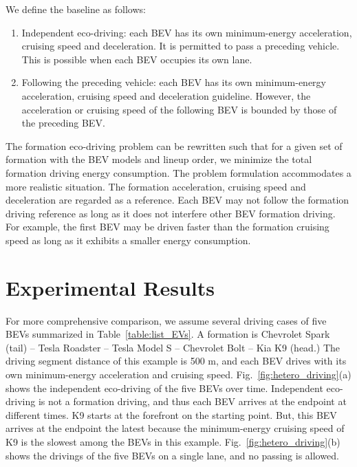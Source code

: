 \documentclass{IEEEtran}
\begin{document}
We define the baseline as follows:
\begin{enumerate}
\item Independent eco-driving: each BEV has its own minimum-energy acceleration, cruising speed and deceleration. 
It is permitted to pass a preceding vehicle. This is possible when each BEV occupies its own lane.
\item Following the preceding vehicle: each BEV has its own minimum-energy acceleration, cruising speed and deceleration guideline. However, the acceleration or cruising speed of the following BEV is bounded by those of the preceding BEV.
\end{enumerate}

The formation eco-driving problem can be rewritten such that for a given set of formation with the BEV models and lineup order, we minimize the total formation driving energy consumption.
The problem formulation accommodates a more realistic situation. The formation acceleration, cruising speed and deceleration are regarded as a reference. Each BEV may not follow the formation driving reference as long as it does not interfere other BEV formation driving. For example, the first BEV may be driven faster than the formation cruising speed as long as it exhibits a smaller energy consumption.

\section{Experimental Results}\label{sec:exp}



For more comprehensive comparison, we assume several driving cases of five BEVs summarized in Table~\ref{table:list_EVs}. A formation is Chevrolet Spark (tail) -- Tesla Roadster -- Tesla Model S -- Chevrolet Bolt -- Kia K9 (head.)
The driving segment distance of this example is 500 m, and each BEV drives with its own minimum-energy acceleration and cruising speed. 
Fig.~\ref{fig:hetero_driving}(a) shows the independent eco-driving of the five BEVs over time. Independent eco-driving is not a formation driving, and thus each BEV arrives at the endpoint at different times.
K9 starts at the forefront on the starting point. But, this BEV arrives at the endpoint the latest because the minimum-energy cruising speed of K9 is the slowest among the BEVs in this example. 
Fig.~\ref{fig:hetero_driving}(b) shows the drivings of the five BEVs on a single lane, and no passing is allowed. 
\end{document}
